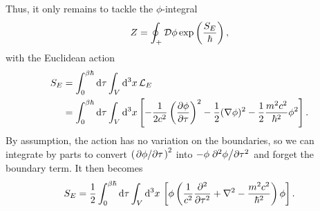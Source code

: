 Thus, it only remains to tackle the $\phi$-integral
\begin{equation}
	Z = \oint_+ \mathcal{D} \phi \exp \left( \frac{S_E}{\hbar} \right) ,
\label{eq:tft:boson_partition_function_momentum_out}
\end{equation}
with the Euclidean action
\begin{equation}
\begin{split}
	S_E &= \int_0^{\beta \hbar} \mathop{}\!\mathrm{d} \tau \int_V \mathop{}\!\mathrm{d}^3 x \, \mathcal{L}_E \\
	    &= \int_0^{\beta \hbar} \mathop{}\!\mathrm{d} \tau \int_V \mathop{}\!\mathrm{d}^3 x \left[ - \frac{1}{2c^2} \pdv{\phi}{\tau}^2 - \frac12 (\nabla \phi)^2 - \frac12 \frac{m^2 c^2}{\hbar^2} \phi^2 \right] .
\end{split}
\label{eq:tft:boson_euclidean_action_definition}
\end{equation}
By assumption, the action has no variation on the boundaries, so we can integrate by parts to convert $\pdv{\phi}/{\tau}^2$ into $-\phi \pdv[2]{\phi}/{\tau}$ and forget the boundary term.
It then becomes
\begin{equation}
	S_E = \frac12 \int_0^{\beta \hbar} \mathop{}\!\mathrm{d} \tau \int_V \mathop{}\!\mathrm{d}^3 x \, \left[ \phi \left( \frac{1}{c^2} \pdv[2]{}{\tau} + \nabla^2 - \frac{m^2 c^2}{\hbar^2} \right) \phi \right] .
\label{eq:tft:boson_euclidean_action_nice}
\end{equation}

